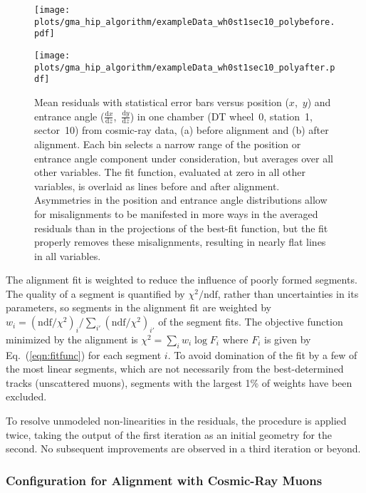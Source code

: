 \documentclass[11pt,twoside,a4paper,cmspaper]{cms-tdr}
\begin{document}
\begin{figure}
\begin{center}
\texttt{[image: plots/gma\_hip\_algorithm/exampleData\_wh0st1sec10\_polybefore.pdf]}

\texttt{[image: plots/gma\_hip\_algorithm/exampleData\_wh0st1sec10\_polyafter.pdf]}
\end{center}

\caption{Mean residuals with statistical error bars versus position ($x$,~$y$)
and entrance angle ($\frac{\textrm{d}x}{\textrm{d}z}$,~$\frac{\textrm{d}y}{\textrm{d}z}$) in one chamber
(DT wheel~0, station~1, sector~10) from cosmic-ray data, (a) before
alignment and (b) after alignment.  Each bin selects a narrow range of
the position or entrance angle component under consideration, but
averages over all other variables.  The fit function, evaluated at
zero in all other variables, is overlaid as lines before and after
alignment.  Asymmetries in the position and entrance angle
distributions allow for misalignments to be manifested in more ways in
the averaged residuals than in the projections of the best-fit function, but the fit properly
removes these misalignments, resulting in nearly flat lines in all variables.
\label{fig:examplefit}}
\end{figure}

The alignment fit is weighted to reduce the influence of poorly formed
segments.  The quality of a segment is quantified by
$\chi^2/\mbox{ndf}$, rather than uncertainties in its parameters, so
segments in the alignment fit are weighted by $w_i =
(\mbox{ndf}/\chi^2)_i/\sum_{i'} (\mbox{ndf}/\chi^2)_{i'}$ of the
segment fits.  The objective function minimized by the alignment is
$\chi^2 = \sum_i w_i \log F_i$ where $F_i$ is given by
Eq.~(\ref{eqn:fitfunc}) for each segment $i$.  To avoid domination of
the fit by a few of the most linear segments, which are not
necessarily from the best-determined tracks (unscattered muons), segments with the largest 1\% of
weights have been excluded.

To resolve unmodeled non-linearities in the residuals, the procedure
is applied twice, taking the output of the first iteration as an
initial geometry for the second.  No subsequent improvements are
observed in a third iteration or beyond.

\subsubsection{Configuration for Alignment with Cosmic-Ray Muons}
\label{sec:configuration}
\end{document}
